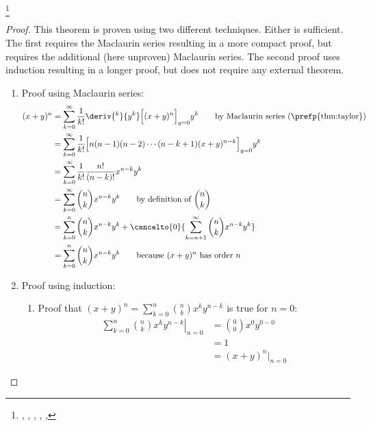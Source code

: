 \begin{theorem}
\footnote{
  ,
  ,
  ,
  ,
  ,
  }
\label{thm:binomial}
\end{theorem}
\begin{proof}
This theorem is proven using two different techniques.
Either is sufficient.
The first requires the Maclaurin series resulting in a more compact proof,
but requires the additional (here unproven) Maclaurin series.
The second proof uses induction resulting in a longer proof,
but does not require any external theorem.

\begin{enumerate}
\item Proof using Maclaurin series:
\begin{align*}
  (x+y)^n
    &= \sum_{k=0}^\infty \frac{1}{k!} \deriv{^k}{y^k}\Big[(x+y)^n\Big]_{y=0} y^k
    \qquad\text{by Maclaurin series (\prefp{thm:taylor})}
  \\&= \sum_{k=0}^\infty \frac{1}{k!} \Big[n(n-1)(n-2)\cdots(n-k+1)(x+y)^{n-k}\Big]_{y=0} y^k
  \\&= \sum_{k=0}^\infty \frac{1}{k!} \frac{n!}{(n-k)!} x^{n-k} y^k
  \\&= \sum_{k=0}^\infty {n\choose k} x^{n-k} y^k
    \qquad\text{by definition of ${n\choose k}$}
  \\&= \sum_{k=0}^n {n\choose k} x^{n-k} y^k
      +\cancelto{0}{\sum_{k=n+1}^\infty {n\choose k} x^{n-k} y^k}
  \\&= \sum_{k=0}^n {n\choose k} x^{n-k} y^k
    \qquad\text{because $(x+y)^n$ has order $n$}
\end{align*}

\item Proof using induction:
\begin{enumerate}
\item Proof that
  $(x+y)^{n} = \sum_{k=0}^{n} {n \choose k} x^k y^{n-k}$
  is true for $n=0$:
\begin{align*}
  \left.\sum_{k=0}^{n} {n \choose k} x^k y^{n-k} \right|_{n=0}
    &= {0 \choose 0} x^0 y^{0-0}
  \\&= 1
  \\&= (x+y)^n|_{n=0}
\end{align*}


\end{enumerate}
\end{enumerate}
\end{proof}
